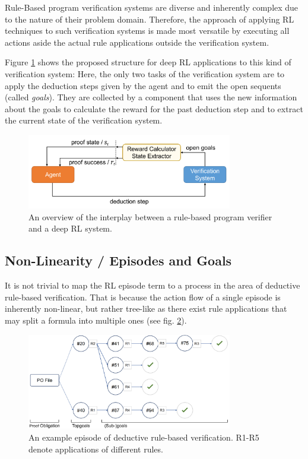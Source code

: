 \documentclass[runningheads,a4paper]{llncs}
\begin{document}
Rule-Based program verification systems are diverse and inherently complex due to the nature of their problem domain. Therefore, the approach of applying RL techniques to such verification systems is made most versatile by executing all actions aside the actual rule applications outside the verification system.

Figure \ref{f:rl4sv} shows the proposed structure for deep RL applications to this kind of verification system: Here, the only two tasks of the verification system are to apply the deduction steps given by the agent and to emit the open sequents (called \textit{goals}). They are collected by a component that uses the new information about the goals to calculate the reward for the past deduction step and to extract the current state of the verification system.

\begin{figure}[ht]
	\centering
	\includegraphics[width=0.8\textwidth]{img/rl4sv_schematic.png}
	\caption{An overview of the interplay between a rule-based program verifier and a deep RL system.}
	\label{f:rl4sv}
\end{figure}

\subsection*{Non-Linearity / Episodes and Goals}

It is not trivial to map the RL episode term to a process in the area of deductive rule-based verification. That is because the action flow of a single episode is inherently non-linear, but rather tree-like as there exist rule applications that may split a formula into multiple ones (see fig. \ref{f:ep}).

\begin{figure}[ht]
	\centering
	\includegraphics[width=0.8\textwidth]{img/rl_episode.png}
	\caption{An example episode of deductive rule-based verification. R1-R5 denote applications of different rules.}
	\label{f:ep}
\end{figure}
\end{document}
